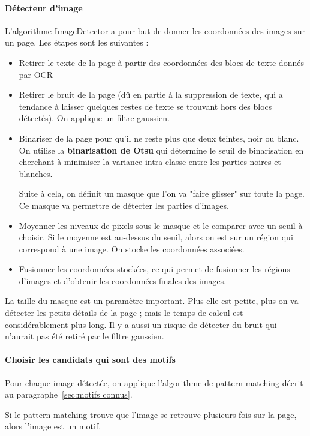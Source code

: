 \documentclass[a4paper, 12pt]{article}
\begin{document}
\paragraph{Détecteur d'image}
L'algorithme ImageDetector a pour but de donner les coordonnées des images sur un page. Les étapes sont les suivantes :
\begin{itemize}
	\item Retirer le texte de la page à partir des coordonnées des blocs de texte donnés par OCR
	\item Retirer le bruit de la page (dû en partie à la suppression de texte, qui a tendance à laisser quelques restes de texte se trouvant hors des blocs détectés). On applique un filtre gaussien.
	\item Binariser de la page pour qu'il ne reste plus que deux teintes, noir ou blanc. On utilise la \textbf{binarisation de Otsu} qui détermine le seuil de binarisation en cherchant à minimiser la variance intra-classe entre les parties noires et blanches.
	
	\smallskip
	Suite à cela, on définit un masque que l'on va "faire glisser" sur toute la page. Ce masque va permettre de détecter les parties d'images.
	
	\item Moyenner les niveaux de pixels sous le masque et le comparer avec un seuil à choisir. Si le moyenne est au-dessus du seuil, alors on est sur un région qui correspond à une image. On stocke les coordonnées associées.
	\item Fusionner les coordonnées stockées, ce qui permet de fusionner les régions d'images et d'obtenir les coordonnées finales des images.
\end{itemize}

La taille du masque est un paramètre important. Plus elle est petite, plus on va détecter les petits détails de la page ; mais le temps de calcul est considérablement plus long. Il y a aussi un risque de détecter du bruit qui n'aurait pas été retiré par le filtre gaussien.

\paragraph{Choisir les candidats qui sont des motifs}
Pour chaque image détectée, on applique l'algorithme de pattern matching décrit au paragraphe~\ref{sec:motifs connus}.

Si le pattern matching trouve que l'image se retrouve plusieurs fois sur la page, alors l'image est un motif.
\end{document}
